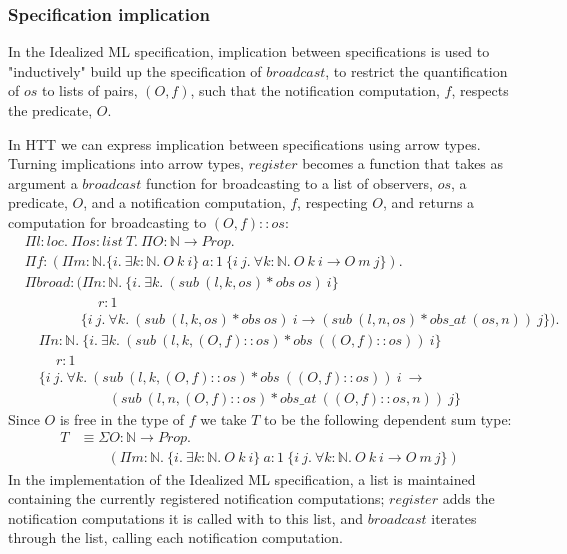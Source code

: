 \documentclass[a4paper,english]{article}
\newcommand{\N}[0]{\mathbb{N}}
\newcommand{\HPROP}[0]{Prop}
\newcommand{\LIST}[0]{list}
\newcommand{\LOC}[0]{loc}
\begin{document}
\subsubsection{Specification implication}

In the Idealized ML specification, implication between specifications is used
to "inductively" build up the specification of $broadcast$, to restrict the
quantification of $os$ to lists of pairs, $(O, f)$, such that the notification
computation, $f$, respects the predicate, $O$. 

In HTT we can express implication between specifications using arrow types.
Turning implications into arrow types, $register$ becomes a function that
takes as argument a $broadcast$ function for broadcasting to a list of
observers, $os$, a predicate, $O$, and a notification computation, $f$,
respecting $O$, and returns a computation for broadcasting to $(O, f)::os$:
\begin{align*}
&\Pi l : \LOC.\ \Pi os : \LIST\ T.\ \Pi O : \N \rightarrow \HPROP.\\
&\Pi f : (\Pi m : \N. \{ i.\ \exists k : \N.\ O\ k\ i\}\ a : 1\ \{ i\ j.\ \forall k : \N.\ O\ k\ i \rightarrow O\ m\ j\}).\\
&\Pi broad : (\Pi n : \N.\ \{ i.\ \exists k.\ (sub\ (l, k, os) * obs\ os)\ i \}\\
&\quad\quad\quad\quad\quad \ r : 1\\
&\quad\quad\quad\quad\{ i\ j.\ \forall k.\ (sub\ (l, k, os) * obs\ os)\ i \rightarrow (sub\ (l, n, os) * obs\_at\ (os, n))\ j \}).\\
&\quad\Pi n : \N.\ \{ i.\ \exists k.\ (sub\ (l, k, (O, f)::os) * obs\ ((O, f)::os))\ i \}\\
&\quad\quad \ r : 1\\
&\quad\{ i\ j.\ \forall k.\ (sub\ (l, k, (O, f)::os) * obs\ ((O, f)::os))\ i\ \rightarrow\\
&\quad\quad\quad\quad\quad\quad (sub\ (l, n, (O, f)::os) * obs\_at\ ((O, f)::os, n))\ j \}
\end{align*}
Since $O$ is free in the type of $f$ we take $T$ to be the following dependent
sum type:
\begin{align*}
T &\equiv \Sigma O : \N \rightarrow \HPROP.\\
&\quad\quad (\Pi m : \N.\ \{ i.\ \exists k : \N.\ O\ k\ i\}\ a : 1\ \{ i\ j.\ \forall k : \N.\ O\ k\ i \rightarrow O\ m\ j \})
\end{align*}
In the implementation of the Idealized ML specification, a list is maintained
containing the currently registered notification computations; $register$ adds
the notification computations it is called with to this list, and $broadcast$
iterates through the list, calling each notification computation. 
\end{document}
